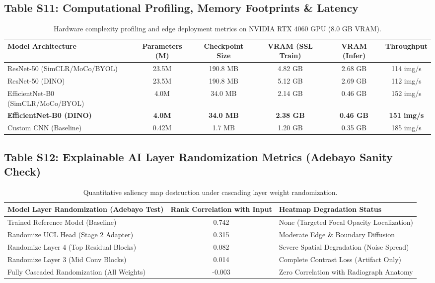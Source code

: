 \documentclass[11pt,a4paper]{article}
\begin{document}
\subsection*{Table S11: Computational Profiling, Memory Footprints \& Latency}
\begin{table}[htbp]
\centering
\caption{Hardware complexity profiling and edge deployment metrics on NVIDIA RTX 4060 GPU (8.0 GB VRAM).}
\label{tab:s11_complexity}
\begin{adjustbox}{max width=\textwidth}
\begin{tabular}{l c c c c c}
\toprule
\textbf{Model Architecture} & \textbf{Parameters (M)} & \textbf{Checkpoint Size} & \textbf{VRAM (SSL Train)} & \textbf{VRAM (Infer)} & \textbf{Throughput} \\
\midrule
ResNet-50 (SimCLR/MoCo/BYOL) & 23.5M & 190.8 MB & 4.82 GB & 2.68 GB & 114 img/s \\
ResNet-50 (DINO)            & 23.5M & 190.8 MB & 5.12 GB & 2.69 GB & 112 img/s \\
\midrule
EfficientNet-B0 (SimCLR/MoCo/BYOL) & 4.0M & 34.0 MB & 2.14 GB & 0.46 GB & 152 img/s \\
\textbf{EfficientNet-B0 (DINO)}    & \textbf{4.0M} & \textbf{34.0 MB} & \textbf{2.38 GB} & \textbf{0.46 GB} & \textbf{151 img/s} \\
\midrule
Custom CNN (Baseline)       & 0.42M & 1.7 MB  & 1.20 GB & 0.35 GB & 185 img/s \\
\bottomrule
\end{tabular}
\end{adjustbox}
\end{table}

\subsection*{Table S12: Explainable AI Layer Randomization Metrics (Adebayo Sanity Check)}
\begin{table}[htbp]
\centering
\caption{Quantitative saliency map destruction under cascading layer weight randomization.}
\label{tab:s12_xai}
\begin{adjustbox}{max width=\textwidth}
\begin{tabular}{l c l}
\toprule
\textbf{Model Layer Randomization (Adebayo Test)} & \textbf{Rank Correlation with Input} & \textbf{Heatmap Degradation Status} \\
\midrule
Trained Reference Model (Baseline)        & 0.742 & None (Targeted Focal Opacity Localization) \\
Randomize UCL Head (Stage 2 Adapter)       & 0.315 & Moderate Edge \& Boundary Diffusion \\
Randomize Layer 4 (Top Residual Blocks)   & 0.082 & Severe Spatial Degradation (Noise Spread) \\
Randomize Layer 3 (Mid Conv Blocks)       & 0.014 & Complete Contrast Loss (Artifact Only) \\
Fully Cascaded Randomization (All Weights)& -0.003& Zero Correlation with Radiograph Anatomy \\
\bottomrule
\end{tabular}
\end{adjustbox}
\end{table}
\end{document}
